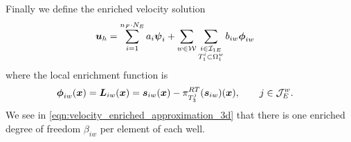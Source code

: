 Finally we define the enriched velocity solution
\begin{align}
    \mathbf{\boldsymbol{u}}_h &= 
    \sum \limits_{i=1}^{n_F\cdot N_E} a_i \mathbf{\boldsymbol{\psi}}_i + 
    \sum \limits_{w\in\mathcal{W}} \sum \limits_{\substack{i\in\mathcal{I}_{1E} \\ T^i_1\subset\Omega^w_1}}
    b_{iw} \mathbf{\boldsymbol{\phi}}_{iw} \label{eqn:velocity_enriched_approximation_3d}
\end{align}
where the local enrichment function is
\begin{align} \label{eqn:local_enr_vel_3d}
    \mathbf{\boldsymbol{\phi}}_{iw}(\mathbf{\boldsymbol{x}}) = \mathbf{\boldsymbol{L}}_{iw}(\mathbf{\boldsymbol{x}}) &= \mathbf{\boldsymbol{s}}_{iw}(\mathbf{\boldsymbol{x}}) - \pi^{RT}_{T^j_3}(\mathbf{\boldsymbol{s}}_{iw})(\mathbf{\boldsymbol{x}}), \qquad j\in\mathcal{J}^w_E.
\end{align}
We see in \eqref{eqn:velocity_enriched_approximation_3d} that there is
one enriched degree of freedom $\beta_{iw}$ per element of each well.



